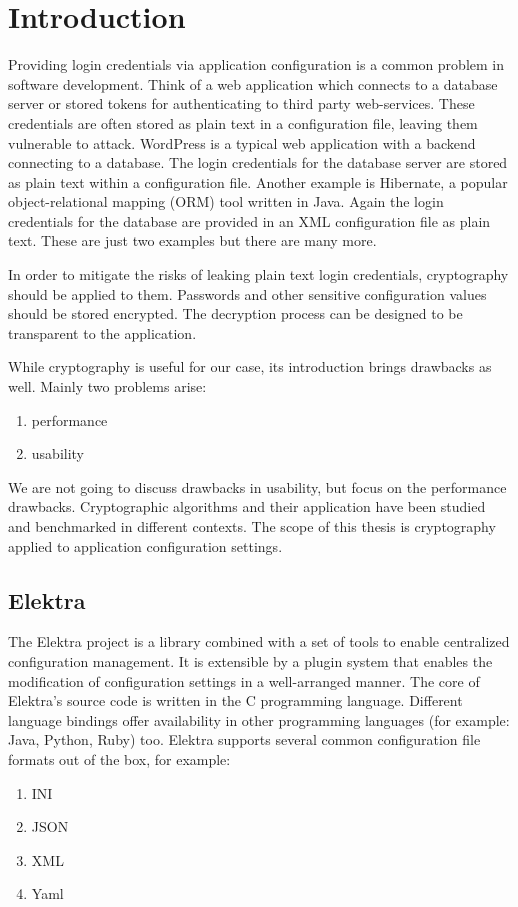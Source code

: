 \chapter{Introduction}

Providing login credentials via application configuration is a common problem in software development.
Think of a web application which connects to a database server or stored tokens for authenticating to third party web-services.
These credentials are often stored as plain text in a configuration file, leaving them vulnerable to attack.
WordPress is a typical web application with a backend connecting to a database.
The login credentials for the database server are stored as plain text within a configuration file.\cite{wordpress-doc}
Another example is Hibernate, a popular object-relational mapping (ORM) tool written in Java.
Again the login credentials for the database are provided in an XML configuration file as plain text.\cite{hibernate-doc}
These are just two examples but there are many more.

In order to mitigate the risks of leaking plain text login credentials, cryptography should be applied to them.
Passwords and other sensitive configuration values should be stored encrypted.
The decryption process can be designed to be transparent to the application.

While cryptography is useful for our case, its introduction brings drawbacks as well.
Mainly two problems arise:
\begin{enumerate}
\item performance
\item usability
\end{enumerate}

We are not going to discuss drawbacks in usability, but focus on the performance drawbacks.
Cryptographic algorithms and their application have been studied and benchmarked in different contexts.\cite{thakur2011aes,ocf,freebsdtls}
The scope of this thesis is cryptography applied to application configuration settings.

\section{Elektra}

The Elektra project is a library combined with a set of tools to enable centralized configuration management.
It is extensible by a plugin system that enables the modification of configuration settings in a well-arranged manner.
The core of Elektra's source code is written in the C programming language.
Different language bindings offer availability in other programming languages (for example: Java, Python, Ruby) too.
Elektra supports several common configuration file formats out of the box, for example:\cite{raab2010thesis,elektra-doc}
\begin{enumerate}
\item INI
\item JSON
\item XML
\item Yaml
\end{enumerate}

